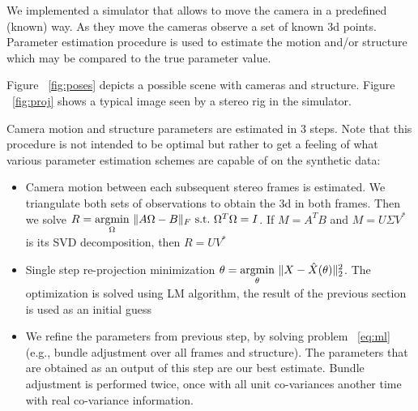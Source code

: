 \documentclass[10pt]{article}         %
\DeclarePairedDelimiter\norm{\lVert}{\rVert}%
\begin{document}
We implemented a simulator that allows to move the camera in a
predefined (known) way.  As they move the cameras observe a set of known 3d
points. Parameter estimation procedure is used to estimate the motion
and/or structure which may be compared to the true parameter value.

Figure ~\ref{fig:poses} depicts a possible scene with cameras
and structure. Figure ~\ref{fig:proj} shows a typical image seen by a
stereo rig in the simulator.

Camera motion and structure parameters are estimated in 3 steps. Note
that this procedure is not intended to be optimal but rather to get a
feeling of what various parameter estimation schemes are capable of on
the synthetic data:
\begin{itemize}
\item Camera motion between each subsequent stereo frames is
  estimated. We triangulate both sets of observations to obtain the 3d
  in both frames.  Then we solve $R=\underset{\Omega}{\text{argmin}}\
  \norm{A\Omega - B}_F\ \text{s.t.}\ \Omega^T\Omega=I$. If $M=A^TB$
  and $M=U\Sigma V^*$ is its SVD decomposition, then $R=UV^*$
\item Single step re-projection minimization $\theta =
  \underset{\theta}{\text{argmin}}\ \norm{X-\hat{X}(\theta)}^2_2$.
  The optimization is solved using LM algorithm, the result of the
  previous section is used as an initial guess
\item We refine the parameters from previous step, by solving problem
  ~\ref{eq:ml} (e.g., bundle adjustment over all frames and
  structure).  The parameters that are obtained as an output of this
  step are our best estimate. Bundle adjustment is performed twice,
  once with all unit co-variances another time with real co-variance
  information.
\end{itemize}
\end{document}
